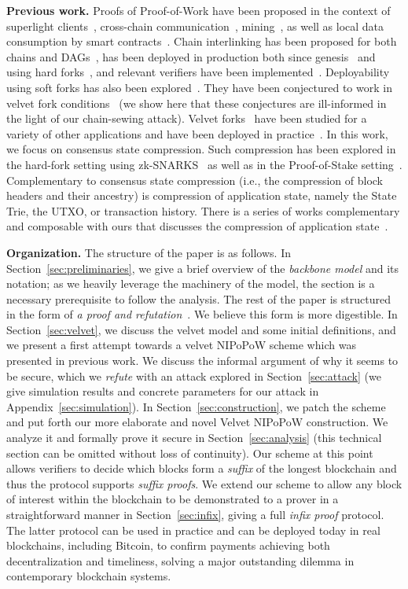 \noindent
\textbf{Previous work.} Proofs of Proof-of-Work have been proposed in the
context of superlight clients~\cite{nipopows,flyclient},
cross-chain communication~\cite{pow-sidechains,burn,crosschain-sok},
mining~\cite{logspace}, as well as
local data consumption by smart contracts~\cite{derivatives}. Chain interlinking
has been proposed for both chains and DAGs~\cite{compactsuperblocks, flydag},
has been deployed in production both since genesis~\cite{ergo,nimiq} and using
hard forks~\cite{heartwood-flyclient}, and relevant verifiers have been
implemented~\cite{gglou,nipopow-gas}.
Deployability using soft forks has also been explored~\cite{soft-power}.
They have
been conjectured to work in velvet fork conditions~\cite{nipopows} (we show
here that these conjectures are ill-informed in the light of our chain-sewing
attack). Velvet forks~\cite{velvet} have been studied for a variety of other
applications and have been deployed in practice~\cite{gtklocker}. In this work,
we focus on consensus state compression. Such compression has been explored in
the hard-fork setting using zk-SNARKS~\cite{coda} as well as in the
Proof-of-Stake setting~\cite{pos-sidechains}. Complementary to consensus state
compression (i.e., the compression of block headers and their ancestry) is
compression of application state, namely the State Trie, the UTXO, or
transaction history. There is a series of works complementary and composable with ours that
discusses the compression of application state~\cite{edrax,ethanos,mimblewimble}.

\noindent
\textbf{Organization.}
The structure of the paper is as follows. In Section~\ref{sec:preliminaries}, we
give a brief overview of the \emph{backbone model} and its notation; as we
heavily leverage the machinery of the model, the section is a necessary
prerequisite to follow the analysis. The rest of the paper is structured in the
form of \emph{a proof and refutation}~\cite{lakatos}. We believe this form is
more digestible. In Section~\ref{sec:velvet}, we discuss the velvet model and
some initial definitions, and we present a first attempt towards a velvet
NIPoPoW scheme which was presented in previous work. We discuss the informal
argument of why it seems to be secure, which we \emph{refute} with an attack explored
in Section~\ref{sec:attack} (we give simulation results and concrete parameters
for our attack in Appendix~\ref{sec:simulation}). In Section~\ref{sec:construction}, we patch the
scheme and put forth our more elaborate and novel Velvet NIPoPoW construction.
We analyze it and formally prove it secure in Section~\ref{sec:analysis} (this
technical section can be omitted without loss of continuity). Our scheme at this
point allows verifiers to decide which blocks form a \emph{suffix} of the
longest blockchain and thus the protocol supports \emph{suffix proofs}. We
extend our scheme to allow any block of interest within the blockchain to be
demonstrated to a prover in a straightforward manner in
Section~\ref{sec:infix}, giving a full \emph{infix proof} protocol. The latter
protocol can be used in practice and can be deployed today in real blockchains,
including Bitcoin, to confirm payments achieving both decentralization and
timeliness, solving a major outstanding dilemma in contemporary blockchain
systems.
